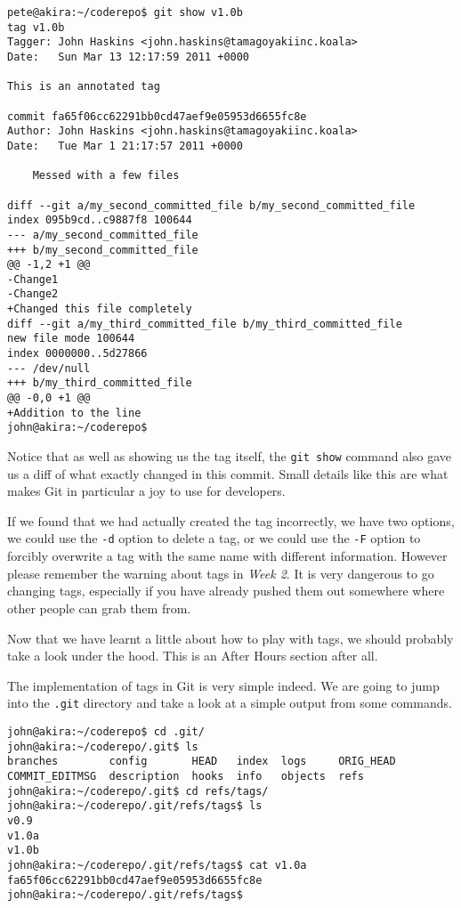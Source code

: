 \begin{Verbatim}[frame=leftline,framerule=1mm,fontsize=\relsize{-3}] 
pete@akira:~/coderepo$ git show v1.0b
tag v1.0b
Tagger: John Haskins <john.haskins@tamagoyakiinc.koala>
Date:   Sun Mar 13 12:17:59 2011 +0000

This is an annotated tag

commit fa65f06cc62291bb0cd47aef9e05953d6655fc8e
Author: John Haskins <john.haskins@tamagoyakiinc.koala>
Date:   Tue Mar 1 21:17:57 2011 +0000

    Messed with a few files

diff --git a/my_second_committed_file b/my_second_committed_file
index 095b9cd..c9887f8 100644
--- a/my_second_committed_file
+++ b/my_second_committed_file
@@ -1,2 +1 @@
-Change1
-Change2
+Changed this file completely
diff --git a/my_third_committed_file b/my_third_committed_file
new file mode 100644
index 0000000..5d27866
--- /dev/null
+++ b/my_third_committed_file
@@ -0,0 +1 @@
+Addition to the line
john@akira:~/coderepo$ 
\end{Verbatim}

Notice that as well as showing us the tag itself, the \texttt{git show} command also gave us a diff of what exactly changed in this commit.  Small details like this are what makes Git in particular a joy to use for developers.

If we found that we had actually created the tag incorrectly, we have two options, we could use the \texttt{-d} option to delete a tag, or we could use the \texttt{-F} option to forcibly overwrite a tag with the same name with different information.  However please remember the warning about tags in \emph{Week 2}.  It is very dangerous to go changing tags, especially if you have already pushed them out somewhere where other people can grab them from.

Now that we have learnt a little about how to play with tags, we should probably take a look under the hood.  This is an After Hours section after all.

The implementation of tags in Git is very simple indeed.  We are going to jump into the \texttt{.git} directory and take a look at a simple output from some commands.

\begin{Verbatim}[frame=leftline,framerule=1mm,fontsize=\relsize{-3}] 
john@akira:~/coderepo$ cd .git/
john@akira:~/coderepo/.git$ ls
branches        config       HEAD   index  logs     ORIG_HEAD
COMMIT_EDITMSG  description  hooks  info   objects  refs
john@akira:~/coderepo/.git$ cd refs/tags/
john@akira:~/coderepo/.git/refs/tags$ ls
v0.9
v1.0a
v1.0b
john@akira:~/coderepo/.git/refs/tags$ cat v1.0a 
fa65f06cc62291bb0cd47aef9e05953d6655fc8e
john@akira:~/coderepo/.git/refs/tags$ 
\end{Verbatim}

